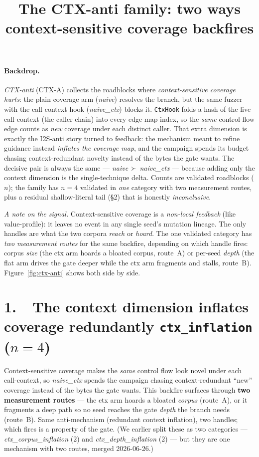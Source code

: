 \documentclass[11pt]{article}
\title{\textbf{The CTX-anti family: two ways context-sensitive coverage backfires}}
\author{}
\date{}
\begin{document}
\maketitle
\vspace{-3em}

\paragraph{Backdrop.} \emph{CTX-anti} (CTX-A) collects the roadblocks where
\emph{context-sensitive coverage} \emph{hurts}: the plain coverage arm
(\emph{naive}) resolves the branch, but the same fuzzer with the call-context
hook (\emph{naive\_ctx}) blocks it. \texttt{CtxHook} folds a hash of the live
call-context (the caller chain) into every edge-map index, so the \emph{same}
control-flow edge counts as \emph{new} coverage under each distinct caller. That
extra dimension is exactly the I2S-anti story turned to feedback: the mechanism
meant to refine guidance instead \emph{inflates the coverage map}, and the
campaign spends its budget chasing context-redundant novelty instead of the
bytes the gate wants. The decisive pair is always the same ---
\emph{naive}$\,\succ\,$\emph{naive\_ctx} --- because adding only the context
dimension is the single-technique delta. Counts are validated roadblocks ($n$);
the family has $n=4$ validated in \emph{one} category with two measurement
routes, plus a residual shallow-literal tail (\S2) that is honestly
\emph{inconclusive}.

\smallskip\noindent\textit{A note on the signal.} Context-sensitive coverage is
a \emph{non-local feedback} (like value-profile): it leaves no event in any
single seed's mutation lineage. The only handles are what the two corpora
\emph{reach} or \emph{hoard}. The one validated category has \emph{two
measurement routes} for the same backfire, depending on which handle fires:
corpus \emph{size} (the ctx arm hoards a bloated corpus, route~A) or per-seed
\emph{depth} (the flat arm drives the gate deeper while the ctx arm fragments and
stalls, route~B). Figure~\ref{fig:ctx-anti} shows both side by side.

\section*{1.\ \ The context dimension inflates coverage redundantly \hfill {\normalsize\texttt{ctx\_inflation} ($n=4$)}}
Context-sensitive coverage makes the \emph{same} control flow look novel under
each call-context, so \emph{naive\_ctx} spends the campaign chasing
context-redundant ``new'' coverage instead of the bytes the gate wants. This
backfire surfaces through \textbf{two measurement routes} --- the ctx arm hoards
a bloated \emph{corpus} (route~A), or it fragments a deep path so no seed reaches
the gate \emph{depth} the branch needs (route~B). Same anti-mechanism (redundant
context inflation), two handles; which fires is a property of the gate. (We
earlier split these as two categories --- \emph{ctx\_corpus\_inflation} ($2$) and
\emph{ctx\_depth\_inflation} ($2$) --- but they are one mechanism with two routes,
merged 2026-06-26.)
\end{document}

